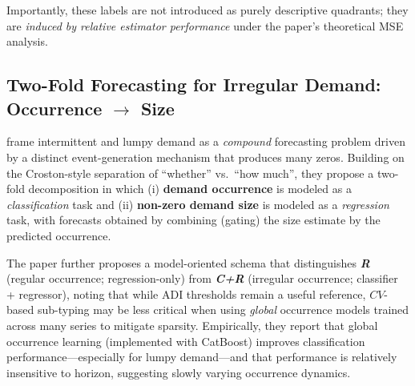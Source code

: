 Importantly, these labels are not introduced as purely descriptive quadrants; they are \emph{induced by relative estimator performance} under the paper's theoretical MSE analysis.

\subsection{Two-Fold Forecasting for Irregular Demand: Occurrence \texorpdfstring{$\rightarrow$}{->} Size}
\label{sec:two-fold-approach-rozanec}

\cite{reframingdemandforecastingtwofold} frame intermittent and lumpy demand as a \emph{compound} forecasting problem driven by a distinct event-generation mechanism that produces many zeros. Building on the Croston-style separation of ``whether'' vs.\ ``how much'', they propose a two-fold decomposition in which (i) \textbf{demand occurrence} is modeled as a \emph{classification} task and (ii) \textbf{non-zero demand size} is modeled as a \emph{regression} task, with forecasts obtained by combining (gating) the size estimate by the predicted occurrence.

The paper further proposes a model-oriented schema that distinguishes \textbf{\textit{R}} (regular occurrence; regression-only) from \textbf{\textit{C+R}} (irregular occurrence; classifier + regressor), noting that while ADI thresholds remain a useful reference, $CV$-based sub-typing may be less critical when using \emph{global} occurrence models trained across many series to mitigate sparsity. Empirically, they report that global occurrence learning (implemented with CatBoost) improves classification performance—especially for lumpy demand—and that performance is relatively insensitive to horizon, suggesting slowly varying occurrence dynamics.

